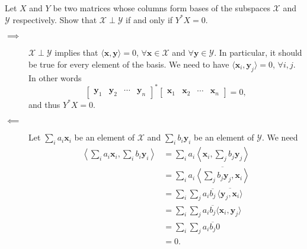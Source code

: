 Let \(X\) and \(Y\) be two matrices whose columns form bases of the subspaces \(\mathcal{X}\) and \(\mathcal{Y}\) respectively.
Show that \(\mathcal{X} \perp \mathcal{Y}\) if and only if \(Y^*X = 0\).
\begin{solution}
  \begin{description}
    \item[$\implies$]
      $\mathcal{X} \perp \mathcal{Y}$ implies that 
      $\langle \mathbf{x},\mathbf{y} \rangle = 0$, $\forall \mathbf{x} \in \mathcal{X}$ 
      and $\forall \mathbf{y} \in \mathcal{Y}$.
      In particular, it should be true for every element of the basis.
      We need to have $\langle \mathbf{x}_i,\mathbf{y}_j\rangle = 0$, $\forall i,j$.
      In other words
      \[
        \begin{bmatrix}
          \mathbf{y}_1 & \mathbf{y}_2 & \cdots & \mathbf{y}_n
        \end{bmatrix}^*
        \begin{bmatrix}
          \mathbf{x}_1 & \mathbf{x}_2 & \cdots & \mathbf{x}_n
        \end{bmatrix}
        = 0,
      \]
      and thus $Y^* X = 0$.
    \item[$\impliedby$]
      Let $\sum_i a_i\mathbf{x}_i$ be an element of $\mathcal{X}$ and $\sum_i b_i\mathbf{y}_i$ be an element of $\mathcal{Y}$.
      We need
      \begin{align*}
        \left\langle\sum_i a_i\mathbf{x}_i, \sum_i b_i\mathbf{y}_i\right\rangle
        & = \sum_i a_i \left\langle \mathbf{x}_i, \sum_j b_j\mathbf{y}_j\right\rangle\\
        & = \sum_i a_i \overline{\left\langle \sum_j b_j\mathbf{y}_j, \mathbf{x}_i\right\rangle}\\
        & = \sum_i \sum_j a_i\overline{b_j} \, \overline{\langle \mathbf{y}_j, \mathbf{x}_i\rangle}\\
        & = \sum_i \sum_j a_i\overline{b_j} \langle \mathbf{x}_i, \mathbf{y}_j\rangle\\
        & = \sum_i \sum_j a_i \overline{b_j} 0\\
        & = 0.
      \end{align*}
  \end{description}
\end{solution}

